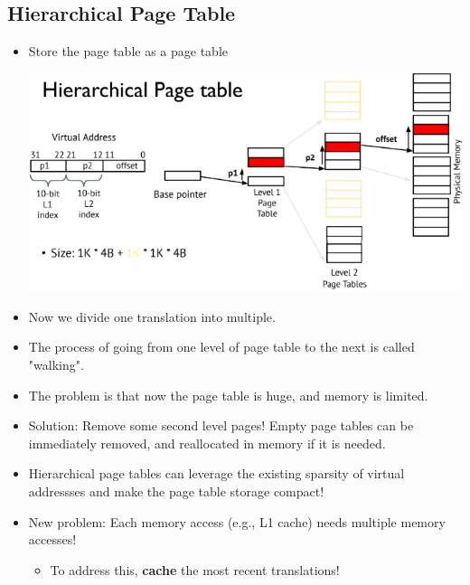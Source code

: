 \documentclass[10pt]{article}
\begin{document}
\subsection*{Hierarchical Page Table}
\begin{itemize}
    \item Store the page table as a page table
    \begin{center}
        \includegraphics*[scale=0.7]{W7_14.png}
    \end{center}
    \item Now we divide one translation into multiple.  
    \item The process of going from one level of page table to the next is called "walking".
    \item The problem is that now the page table is huge, and memory is limited.
    \item Solution: Remove some second level pages!  Empty page tables can be immediately removed, and reallocated in memory if it is needed.
    \item Hierarchical page tables can leverage the existing sparsity of virtual addressses and make the page table storage compact!
    \item New problem: Each memory access (e.g., L1 cache) needs multiple memory accesses!
    \begin{itemize}
        \item To address this, \textbf{cache} the most recent translations!
    \end{itemize}
\end{itemize}
\end{document}
